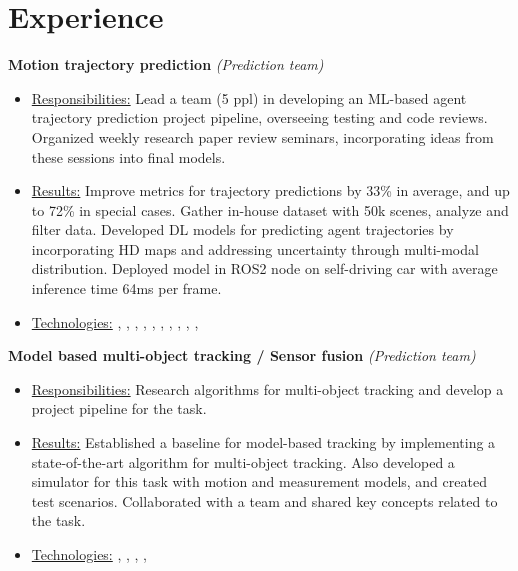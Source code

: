 \section*{\sectionformat Experience}
% 


\textbf{Motion trajectory prediction} \textit{(Prediction team)}
\begin{itemize}
    \item[] \underline{Responsibilities:} Lead a team (5 ppl) in developing an ML-based agent trajectory prediction project pipeline, overseeing testing and code reviews. Organized weekly research paper review seminars, incorporating ideas from these sessions into final models.
    \item[] \underline{Results:} Improve metrics for trajectory predictions by 33\% in average, and up to 72\% in special cases. Gather in-house dataset with 50k scenes, analyze and filter data. Developed DL models for predicting agent trajectories by incorporating HD maps and addressing uncertainty through multi-modal distribution. Deployed model in ROS2 node on self-driving car with average inference time 64ms per frame. 
    \item[] \underline{Technologies:} , , , , , , , , , , 
\end{itemize}

\textbf{Model based multi-object tracking / Sensor fusion} \textit{(Prediction team)}
\begin{itemize}
    \item[] \underline{Responsibilities:} Research algorithms for multi-object tracking and develop a project pipeline for the task.
    \item[] \underline{Results:} Established a baseline for model-based tracking by implementing a state-of-the-art algorithm for multi-object tracking. Also developed a simulator for this task with motion and measurement models, and created test scenarios. Collaborated with a team and shared key concepts related to the task.
    \item[] \underline{Technologies:} , , , , 
\end{itemize}


